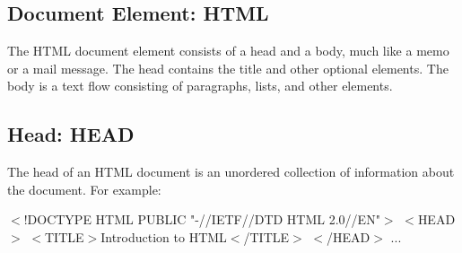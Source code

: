 \par \subsection*{Document Element:  HTML}\par 
The HTML document element consists of a head and a body, much
like a memo or a mail message.  The head contains the
title and other optional elements.  The body is a text flow
consisting of paragraphs, lists, and other elements.
\par \subsection*{Head:  HEAD}\par 
The head of an HTML document is an unordered collection of
information about the document.  For example:
\par $<$!DOCTYPE HTML PUBLIC "-//IETF//DTD HTML 2.0//EN"$>$
$<$HEAD$>$
$<$TITLE$>$Introduction to HTML$<$/TITLE$>$
$<$/HEAD$>$
...
